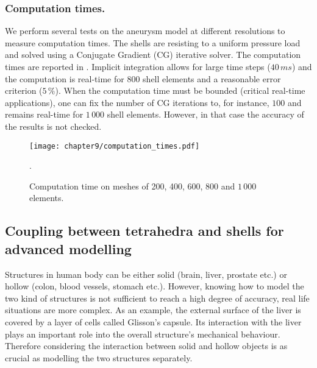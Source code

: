 \subsubsection*{Computation times.}
We perform several tests on the aneurysm model at different resolutions to measure computation times. The shells are resisting to a uniform pressure load and solved using a Conjugate Gradient (CG) iterative solver. The computation times are reported in . Implicit integration allows for large time steps ($40\,ms$) and the computation is real-time for 800 shell elements and a reasonable error criterion ($5\,\%$). When the computation time must be bounded (critical real-time applications), one can fix the number of CG iterations to, for instance, $100$ and remains real-time for $1\,000$ shell elements. However, in that case the accuracy of the results is not checked.
%
\begin{figure}[ht]
\centering
\texttt{[image: chapter9/computation\_times.pdf]}
\caption {Computation time on meshes of 200, 400, 600, 800 and $ 1\,000 $ elements.}.
\label{chap9:fig-computation}
\end{figure}

\subsection{Coupling between tetrahedra and shells for advanced modelling}
Structures in human body can be either solid (brain, liver, prostate etc.) or hollow (colon, blood vessels, stomach etc.). However, knowing how to model the two kind of structures is not sufficient to reach a high degree of accuracy, real life situations are more complex. As an example, the external surface of the liver is covered by a layer of cells called Glisson's capsule. Its interaction with the liver plays an important role into the overall structure's mechanical behaviour. Therefore considering the interaction between solid and hollow objects is as crucial as modelling the two structures separately. 


